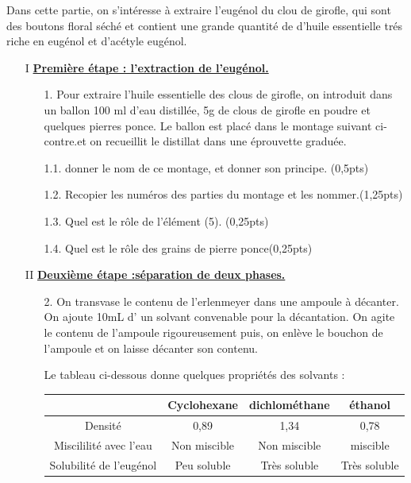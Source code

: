 \documentclass[12pt]{article}
\begin{document}
Dans cette partie, on s’intéresse à extraire l’eugénol du clou de
girofle, qui sont des boutons floral séché et contient une grande quantité de d’huile
essentielle trés riche en eugénol et d’acétyle eugénol.
\begin{enumerate}
	\item[I] \underline{\textbf{Première étape : l’extraction de l’eugénol.}}
		\begin{enumerate}
			\item[1.] Pour extraire l’huile essentielle des clous de girofle, on
introduit dans un ballon 100 ml d’eau distillée, 5g de clous de
girofle en poudre et quelques pierres ponce. Le ballon est placé dans
le montage suivant ci-contre.et on recueillit le distillat dans une
éprouvette graduée.
	\item[1.1.] donner le nom de ce montage, et donner son principe. \dotfill(0,5pts)
	\item [1.2.]Recopier les numéros des parties du montage et les nommer.\dotfill(1,25pts)
	\item [1.3.]Quel est le rôle de l’élément (5). \dotfill(0,25pts)
	\item [1.4.]Quel est le rôle des grains de pierre ponce\dotfill(0,25pts)

		\end{enumerate}
	\item[II] \underline{\textbf{Deuxième étape :séparation de deux phases. }}
		\begin{enumerate}
			\item [2.]On transvase le contenu de l’erlenmeyer dans une ampoule à décanter. On ajoute 10mL d’ un solvant
convenable pour la décantation. On agite le contenu de l’ampoule rigoureusement puis, on enlève le bouchon
de l’ampoule et on laisse décanter son contenu.

Le tableau ci-dessous donne quelques propriétés des solvants :
\begin{center}
\begin{tabular}{ | c | c | c | c | }
	\hline
							& Cyclohexane & dichlométhane &éthanol  \\\hline 
	Densité				    & 0,89        & 1,34          & 0,78\\\hline  
	Miscililité avec l’eau  & Non miscible& Non miscible  & miscible\\\hline  
	Solubilité de l’eugénol & Peu soluble & Très soluble & Très soluble\\\hline  
\end{tabular}
\end{center}


\end{enumerate}
\end{enumerate}
\end{document}
